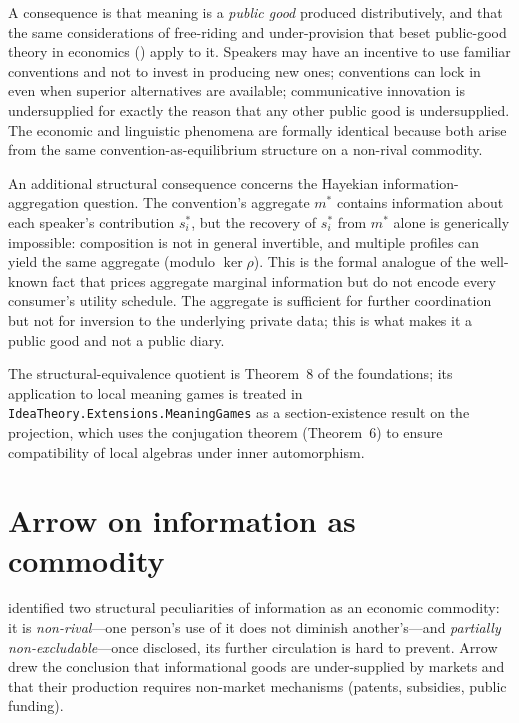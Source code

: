 A consequence is that meaning is a \emph{public good} produced
distributively, and that the same considerations of free-riding and
under-provision that beset public-good theory in economics
(\cite{Olson1965, Hardin1982}) apply to it. Speakers may have an
incentive to use familiar conventions and not to invest in producing
new ones; conventions can lock in even when superior alternatives are
available; communicative innovation is undersupplied for exactly the
reason that any other public good is undersupplied. The economic and
linguistic phenomena are formally identical because both arise from
the same convention-as-equilibrium structure on a non-rival commodity.

An additional structural consequence concerns the Hayekian
information-aggregation question. The convention's aggregate
$m^\ast$ contains information about each speaker's contribution
$s^\ast_i$, but the recovery of $s^\ast_i$ from $m^\ast$ alone is
generically impossible: composition is not in general invertible, and
multiple profiles can yield the same aggregate (modulo $\ker\rho$).
This is the formal analogue of the well-known fact that prices
aggregate marginal information but do not encode every consumer's
utility schedule. The aggregate is sufficient for further
coordination but not for inversion to the underlying private data;
this is what makes it a public good and not a public diary.

\formalstatus The structural-equivalence quotient is Theorem~8 of the
foundations; its application to local meaning games is treated in
\texttt{IdeaTheory.Extensions.MeaningGames} as a section-existence
result on the projection, which uses the conjugation theorem
(Theorem~6) to ensure compatibility of local algebras under inner
automorphism.

\section{Arrow on information as commodity}\label{sec:arrow}

\cite{Arrow1962} identified two structural peculiarities of
information as an economic commodity: it is \emph{non-rival}---one
person's use of it does not diminish another's---and \emph{partially
non-excludable}---once disclosed, its further circulation is hard to
prevent. Arrow drew the conclusion that informational goods are
under-supplied by markets and that their production requires non-market
mechanisms (patents, subsidies, public funding).

